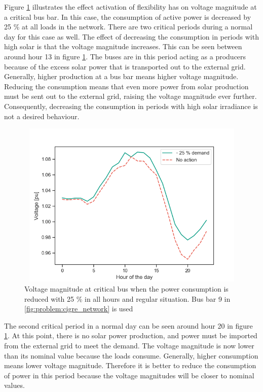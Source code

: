 \documentclass[class=book, crop=false, 11pt]{standalone}
\begin{document}
Figure \ref{fig:results:decrease_demand_voltage} illustrates the effect activation of flexibility has on voltage magnitude at a critical bus bar. In this case, the consumption of active power is decreased by 25 \% at all loads in the network. There are two critical periods during a normal day for this case as well. The effect of decreasing the consumption in periods with high solar is that the voltage magnitude increases. This can be seen between around hour 13 in figure \ref{fig:results:decrease_demand_voltage}. The buses are in this period acting as a producers because of the excess solar power that is transported out to the external grid. Generally, higher production at a bus bar means higher voltage magnitude. Reducing the consumption means that even more power from solar production must be sent out to the external grid, raising the voltage magnitude ever further. Consequently, decreasing the consumption in periods with high solar irradiance is not a desired behaviour. 

\begin{figure}[h]
    \center
\includegraphics[height=8cm, width=12cm]{figures/decrease_demand_voltage.png}
    \caption[size = 9]{Voltage magnitude at critical bus when the power consumption is reduced with 25 \% in all hours and regular situation. Bus bar 9 in \ref{fig:problem:cigre_network} is used}
    \label{fig:results:decrease_demand_voltage}
\end{figure}


The second critical period in a normal day can be seen around hour 20 in figure \ref{fig:results:decrease_demand_voltage}. At this point, there is no solar power production, and power must be imported from the external grid to meet the demand. The voltage magnitude is now lower than its nominal value because the loads consume. Generally, higher consumption means lower voltage magnitude. Therefore it is better to reduce the consumption of power in this period because the voltage magnitudes will be closer to nominal values.
\end{document}
